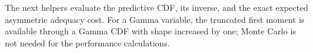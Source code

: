 \documentclass[
  10pt,
]{article}
\newenvironment{Shaded}{\begin{snugshade}}{\end{snugshade}}
\newcommand{\AttributeTok}[1]{\textcolor[rgb]{0.77,0.63,0.00}{#1}}
\newcommand{\DecValTok}[1]{\textcolor[rgb]{0.00,0.00,0.81}{#1}}
\newcommand{\FunctionTok}[1]{\textcolor[rgb]{0.00,0.00,0.00}{#1}}
\newcommand{\NormalTok}[1]{#1}
\newcommand{\OtherTok}[1]{\textcolor[rgb]{0.56,0.35,0.01}{#1}}
\newcommand{\SpecialCharTok}[1]{\textcolor[rgb]{0.00,0.00,0.00}{#1}}
\begin{document}
\begin{Shaded}
\end{Shaded}

The next helpers evaluate the predictive CDF, its inverse, and the exact
expected asymmetric adequacy cost. For a Gamma variable, the truncated
first moment is available through a Gamma CDF with shape increased by
one; Monte Carlo is not needed for the performance calculations.
\end{document}
